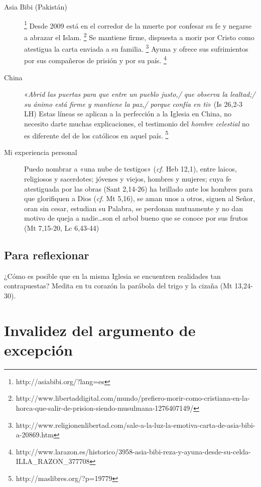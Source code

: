 \documentclass{article}
\begin{document}
\begin{description}
\item[Asia Bibi (Pakistán)]%
        \footnote{http://asiabibi.org/?lang=es}
    Desde 2009 está en el corredor de la muerte por confesar su fe y negarse a abrazar el Islam.%
        \footnote{http://www.libertaddigital.com/mundo/prefiero-morir-como-cristiana-en-la-horca-que-salir-de-prision-siendo-musulmana-1276407149/}
    Se mantiene firme, dispuesta a morir por Cristo como atestigua la carta enviada a su familia.%
        \footnote{http://www.religionenlibertad.com/sale-a-la-luz-la-emotiva-carta-de-asia-bibi-a-20869.htm}
    Ayuna y ofrece sus sufrimientos por sus compañeros de prisión y por su país.%
        \footnote{http://www.larazon.es/historico/3958-asia-bibi-reza-y-ayuna-desde-su-celda-ILLA\_RAZON\_377708}

\item[China]
    «\emph{Abrid las puertas para que entre un pueblo justo,/
    que observa la lealtad;/
    su ánimo está firme y mantiene la paz,/
    porque confía en ti}» (Is 26,2-3 LH) Estas líneas se aplican a la perfección a la Iglesia en China, no necesito darte muchas explicaciones, el testimonio del \emph{hombre celestial} no es diferente del de los católicos en aquel país.%
        \footnote{http://maslibres.org/?p=19779}
    
\item[Mi experiencia personal]
    Puedo nombrar a «una nube de testigos» (\emph{cf.} Heb 12,1), entre laicos, religiosos y sacerdotes; jóvenes y viejos, hombres y mujeres; cuya fe atestiguada por las obras (Sant 2,14-26) ha brillado ante los hombres para que glorifiquen a Dios (\emph{cf.} Mt 5,16), se aman unos a otros, siguen al Señor, oran sin cesar, estudian su Palabra, se perdonan mutuamente y no dan motivo de queja a nadie\ldots son el arbol bueno que se conoce por sus frutos (Mt 7,15-20, Lc 6,43-44)
\end{description}

\subsection{Para reflexionar}

¿Cómo es posible que en la misma Iglesia se encuentren realidades tan contrapuestas? Medita en tu coraz\'on la par\'abola del trigo y la ciza\~na (Mt 13,24-30).

\section{Invalidez del argumento de excepci\'on}
\end{document}
